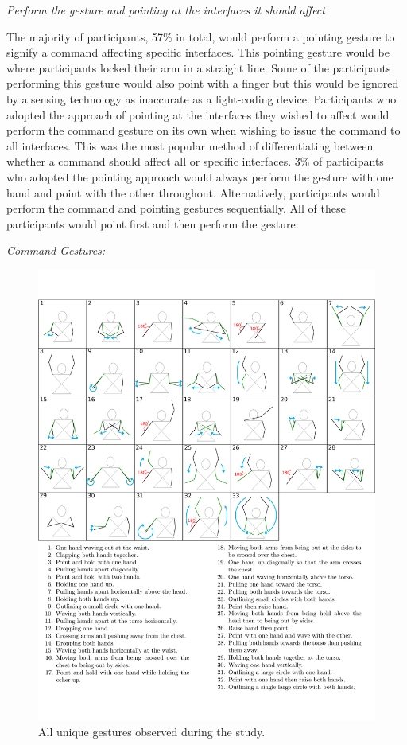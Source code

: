 \documentclass[link]{IWCOMP}
\begin{document}
\textit{Perform the gesture and pointing at the interfaces it should affect}

The majority of participants, 57\% in total, would perform a pointing gesture to signify a command affecting specific interfaces.
This pointing gesture would be where participants locked their arm in a straight line.
Some of the participants performing this gesture would also point with a finger but this would be ignored by a sensing technology as inaccurate as a light-coding device.
Participants who adopted the approach of pointing at the interfaces they wished to affect would perform the command gesture on its own when wishing to issue the command to all interfaces.
This was the most popular method of differentiating between whether a command should affect all or specific interfaces.
3\% of participants who adopted the pointing approach would always perform the gesture with one hand and point with the other throughout.
Alternatively, participants would perform the command and pointing gestures sequentially.
All of these participants would point first and then perform the gesture. 

\textit{Command Gestures:}

\begin{figure}[p]
   \centering
   \includegraphics[width=1\textwidth]{figures/all_gestures.png}
   \caption{All unique gestures observed during the study.}
   \label{fig:allGestures}
\end{figure}
\end{document}
